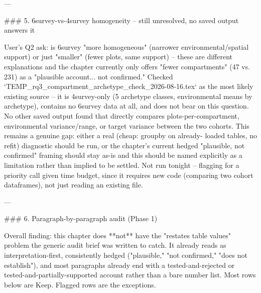 ---

### 5. 6survey-vs-4survey homogeneity -- still unresolved, no saved output answers it

User's Q2 ask: is 6survey "more homogeneous" (narrower environmental/spatial support) or just
"smaller" (fewer plots, same support) -- these are different explanations and the chapter
currently only offers "fewer compartments" (47 vs. 231) as a "plausible account... not
confirmed." Checked `TEMP_rq3_compartment_archetype_check_2026-08-16.tex` as the most likely
existing source -- it is 4survey-only (5 archetype classes, environmental means by archetype),
contains no 6survey data at all, and does not bear on this question. No other saved output found
that directly compares plots-per-compartment, environmental variance/range, or target variance
between the two cohorts. This remains a genuine gap: either a real (cheap: groupby on already-
loaded tables, no refit) diagnostic should be run, or the chapter's current hedged "plausible,
not confirmed" framing should stay as-is and this should be named explicitly as a limitation
rather than implied to be settled. Not run tonight -- flagging for a priority call given time
budget, since it requires new code (comparing two cohort dataframes), not just reading an
existing file.

---

### 6. Paragraph-by-paragraph audit (Phase 1)

Overall finding: this chapter does **not** have the "restates table values" problem the generic
audit brief was written to catch. It already reads as interpretation-first, consistently hedged
("plausible," "not confirmed," "does not establish"), and most paragraphs already end with a
tested-and-rejected or tested-and-partially-supported account rather than a bare number list.
Most rows below are Keep. Flagged rows are the exceptions.

